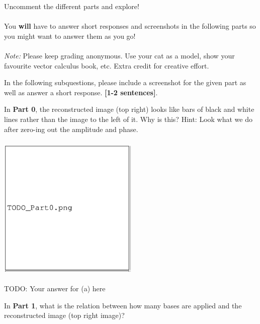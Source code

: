\documentclass{csci1430}
\begin{document}
Uncomment the different parts and explore!
\\
\\
You \textbf{will} have to answer short responses and screenshots in the following parts so you might want to answer them as you go!
\\
\\
\emph{Note:} Please keep grading anonymous. Use your cat as a model, show your favourite vector calculus book, etc. Extra credit for creative effort.

\newpage

In the following subquestions, please include a screenshot for the given part as well as answer a short response. \textbf{[1-2 sentences]}.

\begin{subquestion}[points=2]
In \textbf{Part 0}, the reconstructed image (top right) looks like bars of black and white lines rather than the image to the left of it. Why is this? Hint: Look what we do after zero-ing out the amplitude and phase.
\end{subquestion}

\begin{answer}
\includegraphics[width=0.5\textwidth,height=7cm,keepaspectratio]{images/TODO_Part0.png}

TODO: Your answer for (a) here
\end{answer}

\begin{subquestion}[points=2]
In \textbf{Part 1}, what is the relation between how many bases are applied and the reconstructed image (top right image)?
\end{subquestion}
\end{document}
